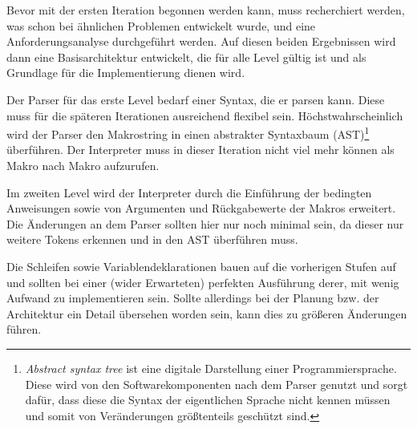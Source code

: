   Bevor mit der ersten Iteration begonnen werden kann, muss recherchiert werden, was schon bei ähnlichen Problemen entwickelt wurde, und eine Anforderungsanalyse durchgeführt werden. Auf diesen beiden Ergebnissen wird dann eine Basisarchitektur entwickelt, die für alle Level gültig ist und als Grundlage für die Implementierung dienen wird.

  Der Parser für das erste Level bedarf einer Syntax, die er parsen kann. Diese muss für die späteren Iterationen ausreichend flexibel sein. Höchstwahrscheinlich wird der Parser den Makrostring in einen abstrakter Syntaxbaum (AST)\footnote{%
    \textit{Abstract syntax tree} ist eine digitale Darstellung einer Programmiersprache. Diese wird von den Softwarekomponenten nach dem Parser genutzt und sorgt dafür, dass diese die Syntax der eigentlichen Sprache nicht kennen müssen und somit von Veränderungen größtenteils geschützt sind.
  } überführen. Der Interpreter muss in dieser Iteration nicht viel mehr können als Makro nach Makro aufzurufen.

  Im zweiten Level wird der Interpreter durch die Einführung der bedingten Anweisungen sowie von Argumenten und Rückgabewerte der Makros erweitert. Die Änderungen an dem Parser sollten hier nur noch minimal sein, da dieser nur weitere Tokens erkennen und in den AST überführen muss.

  Die Schleifen sowie Variablendeklarationen bauen auf die vorherigen Stufen auf und sollten bei einer (wider Erwarteten) perfekten Ausführung derer, mit wenig Aufwand zu implementieren sein. Sollte allerdings bei der Planung bzw. der Architektur ein Detail übersehen worden sein, kann dies zu größeren Änderungen führen.

